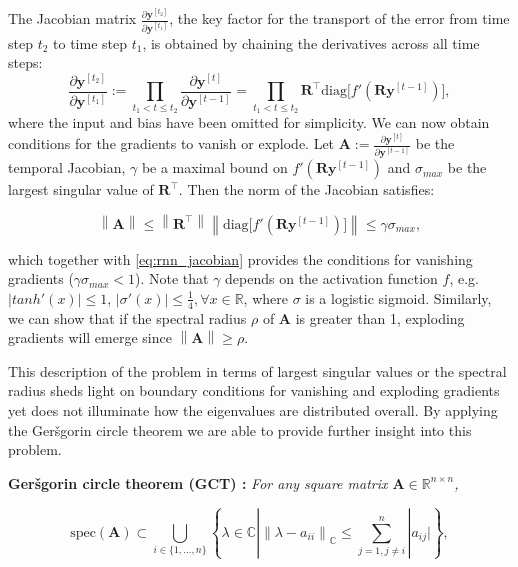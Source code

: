 \documentclass[letterpaper]{article}
\newcommand{\norm}[1]{\left\lVert#1\right\rVert}
\newcommand{\ts}[1]{^{[#1]}}
\def\gers{Ger\v{s}gorin}
\def\gct{GCT}
\def\Amat{\mathbf{A}}
\def\Rmat{\mathbf{R}}
\def\yvec{\mathbf{y}}
\begin{document}
The Jacobian matrix $\frac{\partial \yvec\ts{t_2}}{\partial \yvec\ts{t_1}}$, the key factor for the transport of the error from time step $t_2$ to time step $t_1$, is obtained by chaining the derivatives across all time steps:
\begin{equation}\label{eq:rnn_jacobian}
 \frac{\partial\yvec\ts{t_2}}{\partial\yvec\ts{t_1}} := \prod_{t_1 < t \leq t_2}\frac{\partial\yvec\ts{t}}{\partial\yvec\ts{t-1}}=\prod_{t_1 < t \leq t_2} \Rmat^{\top} \mathrm{diag}\big[f'(\Rmat\yvec\ts{t-1})\big],
\end{equation}
where the input and bias have been omitted for simplicity.
We can now obtain conditions for the gradients to vanish or explode. 
Let $\Amat :=\frac{\partial\yvec\ts{t}}{\partial \yvec\ts{t-1}}$ be the temporal Jacobian, $\gamma$ be a maximal bound on $f'(\Rmat\yvec\ts{t-1})$ and $\sigma_{max}$ be the largest singular value of $\Rmat^{\top}$. Then the norm of the Jacobian satisfies:

\begin{equation}\label{eq:vanishing_inequality}
 \norm {\Amat} \leq \norm{\Rmat^{\top}} \norm {\mathrm{diag}\big[f'(\Rmat\yvec\ts{t-1})\big]} \leq  \gamma \sigma_{max},
\end{equation}
 
which together with \eqref{eq:rnn_jacobian} provides the conditions for vanishing gradients ($\gamma \sigma_{max} < 1$).
Note that $\gamma$ depends on the activation function $f$, e.g. $ |tanh'(x)| \leq 1$, $ |\sigma'(x)| \leq \frac{1}{4}, \forall x \in \mathbb{R}$, where $\sigma$ is a logistic sigmoid.
Similarly, we can show that if the spectral radius $\rho$ of $\Amat$ is greater than 1, exploding gradients will emerge since
$\norm{\Amat} \geq \rho$.

This description of the problem in terms of largest singular values or the spectral radius sheds light on boundary conditions for vanishing and exploding gradients yet does not illuminate how the eigenvalues are distributed overall. By applying the \gers{} circle theorem we are able to provide further insight into this problem.

\textbf{\gers{} circle theorem (\gct{}) \citep{gersgorin}:}
\textit{For any square matrix $\Amat \in \mathbb{R}^{n \times n}$,}

\begin{equation}
\mathrm{spec}(\Amat) \subset \bigcup_{i\in \{1,\dots, n\}} \left \{ \lambda \in \mathbb{C} | \norm{\lambda-a_{ii}}_\mathbb{C} \leq \sum_{j=1, j \neq i}^n |a_{ij}|\right \},
\end{equation}
\end{document}
